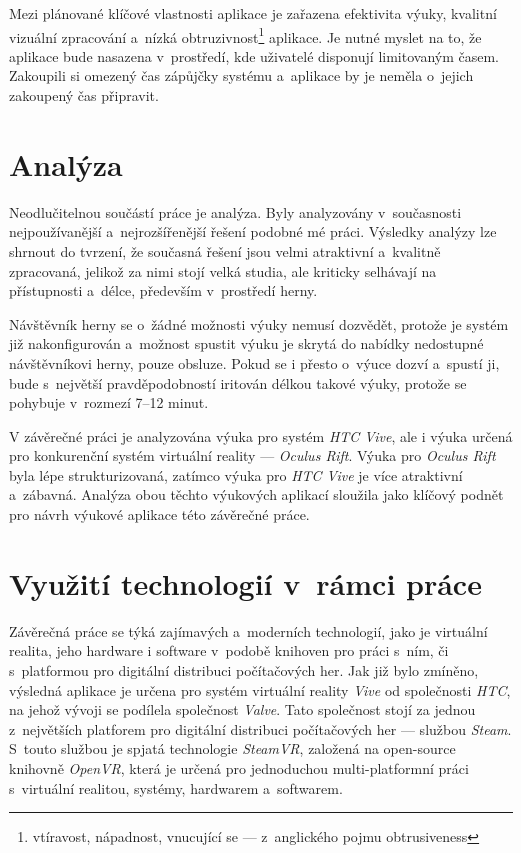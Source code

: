 \documentclass[12pt, a4paper]{article}
\begin{document}
Mezi plánované klíčové vlastnosti aplikace je zařazena efektivita výuky, kvalitní vizuální zpracování a~nízká obtruzivnost\footnote{vtíravost, nápadnost, vnucující se --- z~anglického pojmu obtrusiveness} aplikace. Je nutné myslet na to, že aplikace bude nasazena v~prostředí, kde uživatelé disponují limitovaným časem. Zakoupili si omezený čas zápůjčky systému a~aplikace by je neměla o~jejich zakoupený čas připravit.

\newpage

\section{Analýza}

Neodlučitelnou součástí práce je analýza. Byly analyzovány v~současnosti nejpoužívanější a~nejrozšířenější řešení podobné mé práci. Výsledky analýzy lze shrnout do tvrzení, že současná řešení jsou velmi atraktivní a~kvalitně zpracovaná, jelikož za nimi stojí velká studia, ale kriticky selhávají na přístupnosti a~délce, především v~prostředí herny.

Návštěvník herny se o~žádné možnosti výuky nemusí dozvědět, protože je systém již nakonfigurován a~možnost spustit výuku je skrytá do nabídky nedostupné návštěvníkovi herny, pouze obsluze. Pokud se i přesto o~výuce dozví a~spustí ji, bude s~největší pravděpodobností iritován délkou takové výuky, protože se pohybuje v~rozmezí 7--12 minut.

V závěrečné práci je analyzována výuka pro systém \textit{HTC Vive}, ale i výuka určená pro konkurenční systém virtuální reality --- \textit{Oculus Rift}. Výuka pro \textit{Oculus Rift} byla lépe strukturizovaná, zatímco výuka pro \textit{HTC Vive} je více atraktivní a~zábavná. Analýza obou těchto výukových aplikací sloužila jako klíčový podnět pro návrh výukové aplikace této závěrečné práce.

\section{Využití technologií v~rámci práce}

Závěrečná práce se týká zajímavých a~moderních technologií, jako je virtuální realita, jeho hardware i software v~podobě knihoven pro práci s~ním, či s~platformou pro digitální distribuci počítačových her. Jak již bylo zmíněno, výsledná aplikace je určena pro systém virtuální reality \textit{Vive} od společnosti \textit{HTC}, na jehož vývoji se podílela společnost \textit{Valve}. Tato společnost stojí za jednou z~největších platforem pro digitální distribuci počítačových her --- službou \textit{Steam}. S~touto službou je spjatá technologie \textit{SteamVR}, založená na open-source knihovně \textit{OpenVR}, která je určená pro jednoduchou multi-platformní práci s~virtuální realitou, systémy, hardwarem a~softwarem.\cite{openvr}
\end{document}
